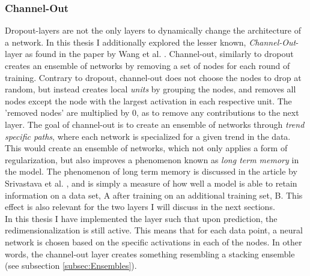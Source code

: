 \subsubsection*{Channel-Out}\label{subsubsec:Channel-Out}
Dropout-layers are not the only layers to dynamically change the architecture of a network. In this thesis I additionally 
explored the lesser known, \emph{Channel-Out}-layer as found in the paper by Wang et al. \cite{wang_maxout_2013}. 
Channel-out, similarly to dropout creates an ensemble of networks by removing a set 
of nodes for each round of training. Contrary to dropout, channel-out does not choose the nodes to drop at random,
but instead creates local \emph{units} by grouping the nodes, and removes all nodes except the node with the largest
activation in each respective unit. The 'removed nodes' are multiplied by 0, as to remove any contributions to the next layer.
The goal of channel-out is to create an ensemble of networks through \emph{trend specific paths},
where each network is specialized for a given trend in the data. This would create an ensemble of networks, which not only applies a form of 
regularization, but also improves a phenomenon known as \emph{long term memory} in the model. The phenomenon of long term memory is discussed in 
the article by Srivastava et al. \cite{srivastava_compete_2013}, and is simply a measure of how well a model is able to retain information on a data set, A after 
training on an additional training set, B. This effect is also relevant for the two layers I will discuss in the next sections.
\\
In this thesis I have implemented the layer such that upon prediction, the redimensionalization 
is still active. This means that for each data point, a neural network is chosen based on the specific activations in 
each of the nodes. In other words, the channel-out layer creates something resembling a stacking ensemble (see subsection 
\ref{subsec:Ensembles}). 
